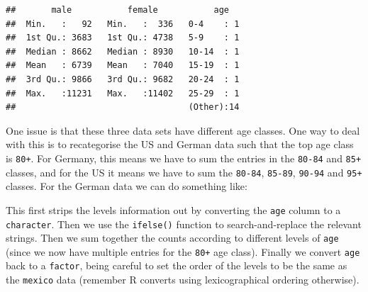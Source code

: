 \documentclass[]{book}
\newenvironment{Shaded}{\begin{snugshade}}{\end{snugshade}}
\newcommand{\KeywordTok}[1]{\textcolor[rgb]{0.13,0.29,0.53}{\textbf{{#1}}}}
\newcommand{\DataTypeTok}[1]{\textcolor[rgb]{0.13,0.29,0.53}{{#1}}}
\newcommand{\StringTok}[1]{\textcolor[rgb]{0.31,0.60,0.02}{{#1}}}
\newcommand{\NormalTok}[1]{{#1}}
\theoremstyle{definition}
\theoremstyle{definition}
\theoremstyle{definition}
\theoremstyle{remark}
\begin{document}
\begin{verbatim}
##       male           female           age    
##  Min.   :   92   Min.   :  336   0-4    : 1  
##  1st Qu.: 3683   1st Qu.: 4738   5-9    : 1  
##  Median : 8662   Median : 8930   10-14  : 1  
##  Mean   : 6739   Mean   : 7040   15-19  : 1  
##  3rd Qu.: 9866   3rd Qu.: 9682   20-24  : 1  
##  Max.   :11231   Max.   :11402   25-29  : 1  
##                                  (Other):14
\end{verbatim}

One issue is that these three data sets have different age classes. One
way to deal with this is to recategorise the US and German data such
that the top age class is \texttt{80+}. For Germany, this means we have
to sum the entries in the \texttt{80-84} and \texttt{85+} classes, and
for the US it means we have to sum the \texttt{80-84}, \texttt{85-89},
\texttt{90-94} and \texttt{95+} classes. For the German data we can do
something like:

\begin{Shaded}
\end{Shaded}

This first strips the levels information out by converting the
\texttt{age} column to a \texttt{character}. Then we use the
\texttt{ifelse()} function to search-and-replace the relevant strings.
Then we sum together the counts according to different levels of
\texttt{age} (since we now have multiple entries for the \texttt{80+}
age class). Finally we convert \texttt{age} back to a \texttt{factor},
being careful to set the order of the levels to be the same as the
\texttt{mexico} data (remember R converts using lexicographical ordering
otherwise).
\end{document}
